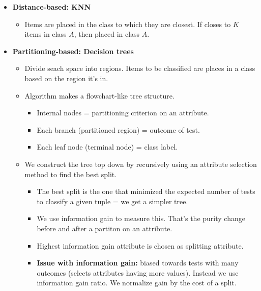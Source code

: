 \begin{multicols}{2}
\begin{itemize}
  \begin{itemize}
    \item
    \textbf{Distance-based: KNN}

    \begin{itemize}
        \item
      Items are placed in the class to which they are closest. If closes
      to \(K\) items in class \(A\), then placed in class \(A\).
    \end{itemize}
  \item
    \textbf{Partitioning-based: Decision trees}

    \begin{itemize}
        \item
      Divide seach space into regions. Items to be classified are places
      in a class based on the region it's in.
    \item
      Algorithm makes a flowchart-like tree structure.

      \begin{itemize}
            \item
        Internal nodes = partitioning criterion on an attribute.
      \item
        Each branch (partitioned region) = outcome of test.
      \item
        Each leaf node (terminal node) = class label.
      \end{itemize}
    \item
      We construct the tree top down by recursively using an attribute
      selection method to find the best split.

      \begin{itemize}
            \item
        The best split is the one that minimized the expected number of
        tests to classify a given tuple = we get a simpler tree.
      \item
        We use information gain to measure this. That's the purity
        change before and after a partiton on an attribute.
      \item
        Highest information gain attribute is chosen as splitting
        attribute.
      \item
        \textbf{Issue with information gain:} biased towards tests with
        many outcomes (selects attributes having more values). Instead
        we use information gain ratio. We normalize gain by the cost of
        a split.
      \end{itemize}
    \end{itemize}
  \end{itemize}
\end{itemize}
\end{multicols}
